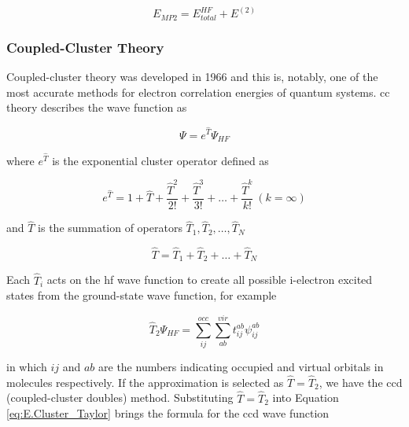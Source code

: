 \begin{refsection}
\begin{equation}
E_{MP2} = E^{HF}_{total} + E^{(2)}
\label{eq:MP2}
\end{equation}




\subsubsection{Coupled-Cluster Theory}
Coupled-cluster theory was developed in 1966 \cite{c1:vcivzek1966} and this is, notably, one of the most accurate methods for electron correlation energies of quantum systems. \acrshort{cc} theory describes the wave function as

\begin{equation}
\Psi = e^{\widehat{T}}\Psi_{HF}
\label{eq:CC_wave function}
\end{equation}

\noindent where $e^{\widehat{T}}$ is the exponential cluster operator defined as 

\begin{equation}
e^{\widehat{T}} = 1 + \widehat{T} + \frac{\widehat{T}^2}{2!} + \frac{\widehat{T}^3}{3!} + \ldots + \frac{\widehat{T}^k}{k!} \ (k = \infty)
\label{eq:E.Cluster_Taylor}
\end{equation}

\noindent and $\widehat{T}$ is the summation of operators $\widehat{T}_1, \widehat{T}_2,\ldots, \widehat{T}_N$

\begin{equation}
\widehat{T} = \widehat{T}_1 + \widehat{T}_2 + \ldots + \widehat{T}_N
\label{T_operator}
\end{equation}

\noindent Each $\widehat{T}_i$ acts on the \acrshort{hf} wave function to create all possible i-electron excited states from the ground-state wave function, for example


\begin{equation}
\widehat{T}_2\Psi_{HF} = \sum_{ij}^{occ}\sum_{ab}^{vir}t_{ij}^{ab}\psi_{ij}^{ab}
\label{eq:T2_operator}
\end{equation}

\noindent in which $ij$ and $ab$ are the numbers indicating occupied and virtual orbitals in molecules respectively. If the approximation is selected as  $\widehat{T} = \widehat{T}_2$, we have the \acrshort{ccd} (coupled-cluster doubles) method. Substituting $\widehat{T} = \widehat{T}_2$ into Equation \ref{eq:E.Cluster_Taylor} brings the formula for the \acrshort{ccd} wave function 


\end{refsection}
